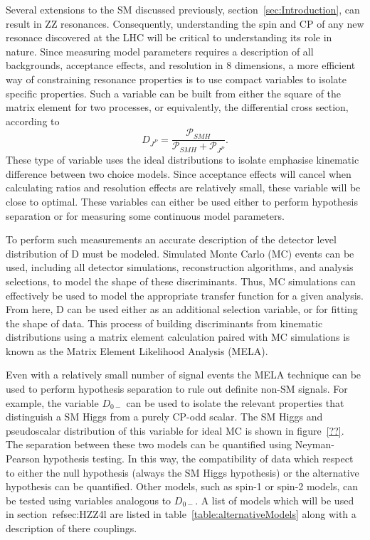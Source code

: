 Several extensions
to the SM discussed previously, section~\ref{sec:Introduction}, can result 
in ZZ resonances.  
Consequently, understanding the spin and CP of any new resonace discovered 
at the LHC will be critical to understanding its role in nature.  
Since measuring model parameters requires a description of all backgrounds, 
acceptance effects, and resolution in 8 dimensions, a more efficient way of
constraining resonance properties is to use compact variables to isolate 
specific properties.  Such a variable can be 
built from either the square of the matrix element for two processes, or 
equivalently, the differential cross section, according to 
\begin{equation}
D_{J^P} = \frac{\mathscr{P}_{SMH}}{\mathscr{P}_{SMH}+\mathscr{P}_{J^{P}}}.
\label{eq:KD}
\end{equation}
These type of variable uses the ideal distributions to isolate emphasise
kinematic difference between two choice models.  Since acceptance effects 
will cancel when calculating ratios and resolution effects are relatively 
small, these variable will be close to optimal.  
These variables can either be used either to perform hypothesis separation
or for measuring some continuous model parameters.  

To perform such measurements an accurate description of the detector 
level distribution of D must be modeled.  Simulated Monte Carlo (MC)
events can be used, including all detector simulations, reconstruction
algorithms, and analysis selections, to model the shape of these discriminants.
Thus, MC simulations can effectively be used to model the appropriate 
transfer function for a given analysis.  From here, D can be used either 
as an additional selection variable, or for fitting the shape of data. 
This process of building discriminants from kinematic distributions
using a matrix element calculation paired with MC simulations is known
as the Matrix Element Likelihood Analysis (MELA).

Even with a relatively small number of signal events the MELA technique
can be used to perform hypothesis separation to rule out definite non-SM 
signals.  For example, the variable $D_{0-}$ can be used to isolate
the relevant properties that distinguish a SM Higgs from a purely CP-odd
scalar.  The SM Higgs and pseudoscalar distribution of this variable for 
ideal MC is shown in figure~\ref{??}.  The separation between these two 
models can be quantified using Neyman-Pearson hypothesis testing.  In this 
way, the compatibility of data which respect to either the null hypothesis
(always the SM Higgs hypothesis) or the alternative hypothesis can be 
quantified.  Other models, such as spin-1 or spin-2 models, can be tested 
using variables analogous to $D_{0-}$.  A list of models which will be 
used in section~ref{sec:HZZ4l} are listed in table~\ref{table:alternativeModels} 
along with a description of there couplings.


